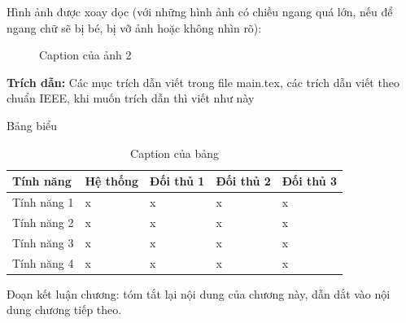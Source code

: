 \FloatBarrier


Hình ảnh được xoay dọc (với những hình ảnh có chiều ngang quá lớn, nếu để ngang chữ sẽ bị bé, bị vỡ ảnh hoặc không nhìn rõ):

\begin{figure} [!htb]
	\centering
	\caption{Caption của ảnh 2}
	\label{fig:UET_logo}
\end{figure}

\FloatBarrier

\vspace{1cm}

\textbf{Trích dẫn:} Các mục trích dẫn viết trong file main.tex, các trích dẫn viết theo chuẩn IEEE, khi muốn trích dẫn thì viết như này \cite{Cockburn2005}



\begin{landscape}
	\noindent Bảng biểu

	\begin{longtable}{|>{\raggedright\arraybackslash}m{4cm}|>{\raggedright\arraybackslash}m{4.5cm}|>{\raggedright\arraybackslash}m{4.5cm}|>{\raggedright\arraybackslash}m{4.5cm}|>{\raggedright\arraybackslash}m{4.5cm}|}
	\caption{Caption của bảng} \\
	\hline
	\textbf{Tính năng} & \textbf{Hệ thống} & \textbf{Đối thủ 1} & \textbf{Đối thủ 2} & \textbf{Đối thủ 3} \\
	\hline
	Tính năng 1 & x & x & x & x \\
	\hline
	Tính năng 2 & x & x & x & x \\
	\hline
	Tính năng 3 & x & x & x & x \\
	\hline
	Tính năng 4 & x & x & x & x \\
	\hline

\end{longtable}
\end{landscape}



\vspace{0.3cm}


Đoạn kết luận chương: tóm tắt lại nội dung của chương này, dẫn dắt vào nội dung chương tiếp theo.